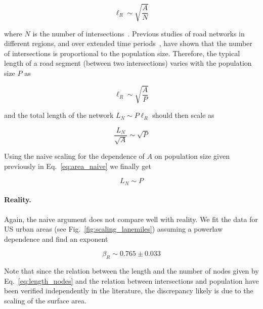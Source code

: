 \begin{equation}
    \ell_R \sim \sqrt{\frac{A}{N}}
\end{equation}

where $N$ is the number of intersections~\cite{Barthelemy:2008}. Previous studies of road networks in
different regions, and over extended time
periods~\cite{Strano:2012,Barthelemy:2013}, have shown that the number of
intersections is proportional to the population size. Therefore, the typical
length of a road segment (between two intersections) varies with the population
size $P$ as

\begin{equation} 
    \ell_R \sim \sqrt{\frac{A}{P}} 
    \label{eq:length_nodes}
\end{equation}

and the total length of the network $L_N \sim P\ell_R$ should then scale as

\begin{equation} 
    \frac{L_N}{\sqrt{A}} \sim \sqrt{P} 
\end{equation}

Using the naive scaling for the dependence of $A$ on population size given
previously in Eq.~\ref{eq:area_naive} we finally get 

\begin{equation} 
    L_N \sim P
\end{equation}

\paragraph{Reality.} Again, the naive argument does not compare well with
reality. We fit the data for US urban areas (see
Fig.~\ref{fig:scaling_lanemiles}) assuming a powerlaw dependence and find an
exponent

\begin{equation}
    \boxed{\beta_R \sim 0.765 \pm 0.033}
\end{equation}

Note that since the relation between the length and the number of nodes given by
Eq.~\ref{eq:length_nodes} and the relation between intersections and population
have been verified independently in the literature, the discrepancy likely is
due to the scaling of the surface area.

